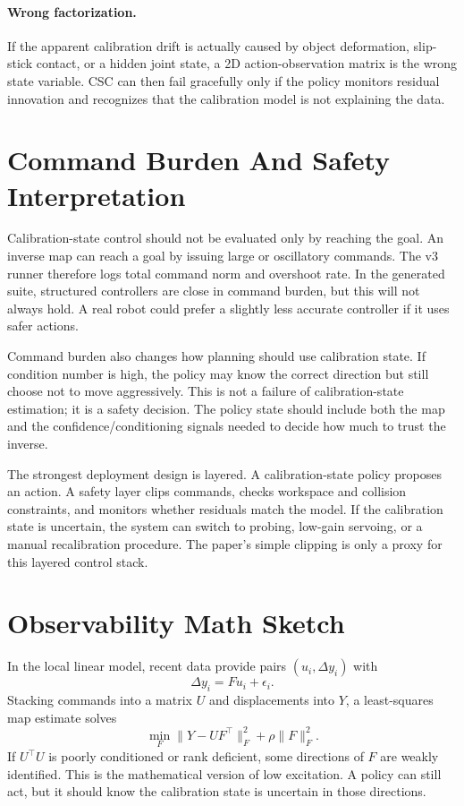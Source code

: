 \documentclass{article}
\newcommand{\obs}{y}
\newcommand{\act}{u}
\newcommand{\cmap}{F}
\begin{document}
\paragraph{Wrong factorization.}
If the apparent calibration drift is actually caused by object deformation,
slip-stick contact, or a hidden joint state, a 2D action-observation matrix is
the wrong state variable. CSC can then fail gracefully only if the policy
monitors residual innovation and recognizes that the calibration model is not
explaining the data.

\section{Command Burden And Safety Interpretation}

Calibration-state control should not be evaluated only by reaching the goal.
An inverse map can reach a goal by issuing large or oscillatory commands. The
v3 runner therefore logs total command norm and overshoot rate. In the
generated suite, structured controllers are close in command burden, but this
will not always hold. A real robot could prefer a slightly less accurate
controller if it uses safer actions.

Command burden also changes how planning should use calibration state. If
condition number is high, the policy may know the correct direction but still
choose not to move aggressively. This is not a failure of calibration-state
estimation; it is a safety decision. The policy state should include both the
map and the confidence/conditioning signals needed to decide how much to trust
the inverse.

The strongest deployment design is layered. A calibration-state policy proposes
an action. A safety layer clips commands, checks workspace and collision
constraints, and monitors whether residuals match the model. If the calibration
state is uncertain, the system can switch to probing, low-gain servoing, or a
manual recalibration procedure. The paper's simple clipping is only a proxy for
this layered control stack.

\section{Observability Math Sketch}

In the local linear model, recent data provide pairs
$(\act_i,\Delta\obs_i)$ with
\[
  \Delta\obs_i = \cmap \act_i+\epsilon_i.
\]
Stacking commands into a matrix $U$ and displacements into $Y$, a least-squares
map estimate solves
\[
  \min_{\cmap}\|Y-U\cmap^\top\|_F^2+\rho\|\cmap\|_F^2.
\]
If $U^\top U$ is poorly conditioned or rank deficient, some directions of
$\cmap$ are weakly identified. This is the mathematical version of low
excitation. A policy can still act, but it should know the calibration state is
uncertain in those directions.
\end{document}
